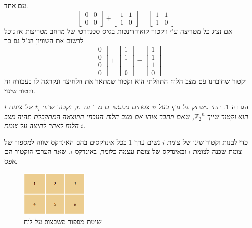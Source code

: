 \documentclass[12pt,leqno]{article}
\theoremstyle{theoremdd}
\newtheorem{definition}{הגדרה}[section]
\newcommand{\Zn}{{\mathbb{Z}_2}^n}
\begin{document}
 עם אחד.
\[
    \begin{bmatrix}
    0 & 0 \\
    0 & 0 
    \end{bmatrix} + 
    \begin{bmatrix}
    1 & 1 \\
    1 & 0 
    \end{bmatrix}=
    \begin{bmatrix}
    1 & 1 \\
    1 & 0 
    \end{bmatrix} 
\]  
 אם נציג כל מטריצה ע"י ווקטור קואורדינטות בסיס סטנדרטי של מרחב מטריצות אז נוכל לרשום את השוויון הנ"ל גם כך
 \[ 
    \begin{bmatrix} 
    0 \\ 0 \\ 0 \\ 0
    \end{bmatrix} +  \begin{bmatrix} 
    1 \\ 1 \\ 1 \\ 0
    \end{bmatrix} =  \begin{bmatrix} 
    1 \\ 1 \\ 1 \\ 0
    \end{bmatrix}  
 \]
וקטור שחיברנו עם מצב הלוח התחלתי הוא וקטור שמתאר את הלחיצה ונקראה לו בעבודה זה וקטור שינוי.
 \begin{definition}
    תהי 
    משחק על גרף בעל
    $n$
    צמתים
    ממספרים מ
    $1$
    עד
    $n$,
    וקטור שינוי
    $t_i$
    של צומת  
    $i$
    הוא 
    וקטור 
    שייך 
    $\Zn$,
    שאם תחבר אותו אם מצב הלוח הנוכחי 
    התוצאה המתקבלת תהיה מצב הלוח 
    לאחר לחיצה על צומת 
    $i$.
\end{definition}
כדי לבנות וקטור שינו 
של 
צומת 
$i$
נשים ערך 
$1$
בכל אינדקסים 
בהם האינדקס שווה 
למספור 
של 
צומת 
שכנה
לצומת
$i$
ובאינדקס של צומת עצמה
כלומר,
באינדקס 
$i$.
שאר הערכי הוקטור הם אפס.

\begin{figure}[ht]
    \caption{שיטת מספור משבצות על לוח}
    \label{fig:numbering_board_2x2}
    \centering
    \includegraphics[width=0.3\textwidth,keepaspectratio]{images/2x3_board.PNG}
\end{figure}
\end{document}
